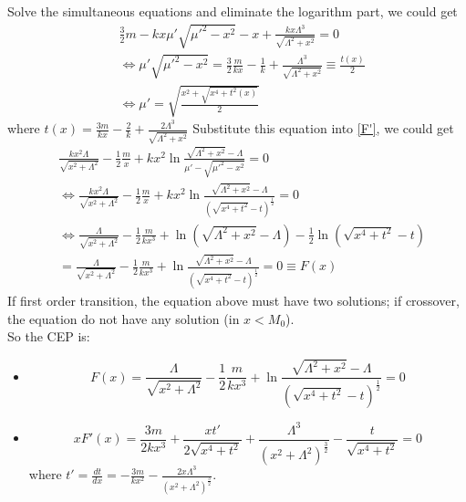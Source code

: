 \documentclass{article}
\begin{document}
Solve the simultaneous equations and eliminate the logarithm part, we could get
\begin{equation}
    \begin{split}
        &\frac{3}{2}m-kx\mu'\sqrt{\mu'^2-x^2}-x+\frac{kx\Lambda^3}{\sqrt{\Lambda^2+x^2}}=0\\
        &\Leftrightarrow \mu'\sqrt{\mu'^2-x^2}=\frac{3}{2}\frac{m}{kx}-\frac{1}{k}+\frac{\Lambda^3}{\sqrt{\Lambda^2+x^2}}\equiv \frac{t(x)}{2}\\
        &\Leftrightarrow \mu'=\sqrt{\frac{x^2+\sqrt{x^4+t^2(x)}}{2}}
    \end{split}
\end{equation}
where $t(x)=\frac{3m}{kx}-\frac{2}{k}+\frac{2\Lambda^3}{\sqrt{\Lambda^2+x^2}}$
Substitute this equation into \eqref{F'}, we could get
    \begin{equation}
        \begin{split}
        &\frac{kx^2\Lambda}{\sqrt{x^2+\Lambda^2}}-\frac{1}{2}\frac{m}{x}+kx^2\ln\frac{\sqrt{\Lambda^2+x^2}-\Lambda}{\mu'-\sqrt{\mu'^2-x^2}}=0\\
        &\Leftrightarrow \frac{kx^2\Lambda}{\sqrt{x^2+\Lambda^2}}-\frac{1}{2}\frac{m}{x}+kx^2\ln\frac{\sqrt{\Lambda^2+x^2}-\Lambda}{(\sqrt{x^4+t^2}-t)^{\frac{1}{2}}}=0\\
        &\Leftrightarrow \frac{\Lambda}{\sqrt{x^2+\Lambda^2}}-\frac{1}{2}\frac{m}{kx^3}+\ln(\sqrt{\Lambda^2+x^2}-\Lambda)-\frac{1}{2}\ln(\sqrt{x^4+t^2}-t)\\
        &= \frac{\Lambda}{\sqrt{x^2+\Lambda^2}}-\frac{1}{2}\frac{m}{kx^3}+\ln\frac{\sqrt{\Lambda^2+x^2}-\Lambda}{(\sqrt{x^4+t^2}-t)^{\frac{1}{2}}}=0\equiv F(x)
        \end{split}
    \end{equation}
    If first order transition, the equation above must have two solutions; if crossover, the equation do not have any solution (in $x<M_0$).\\
    So the CEP is:
    \begin{itemize}
        \item \begin{equation}\label{1}
            F(x)=\frac{\Lambda}{\sqrt{x^2+\Lambda^2}}-\frac{1}{2}\frac{m}{kx^3}+\ln\frac{\sqrt{\Lambda^2+x^2}-\Lambda}{(\sqrt{x^4+t^2}-t)^{\frac{1}{2}}}= 0
        \end{equation}
        \item \begin{equation}\label{2}
            xF'(x)=\frac{3m}{2kx^3}+\frac{xt'}{2\sqrt{x^4+t^2}}+\frac{\Lambda^3}{(x^2+\Lambda^2)^{\frac{3}{2}}}-\frac{t}{\sqrt{x^4+t^2}}=0
        \end{equation}
        where $t'=\frac{dt}{dx}=-\frac{3m}{kx^2}-\frac{2x\Lambda^3}{(x^2+\Lambda^2)^{\frac{3}{2}}}$.
    \end{itemize}
\end{document}

